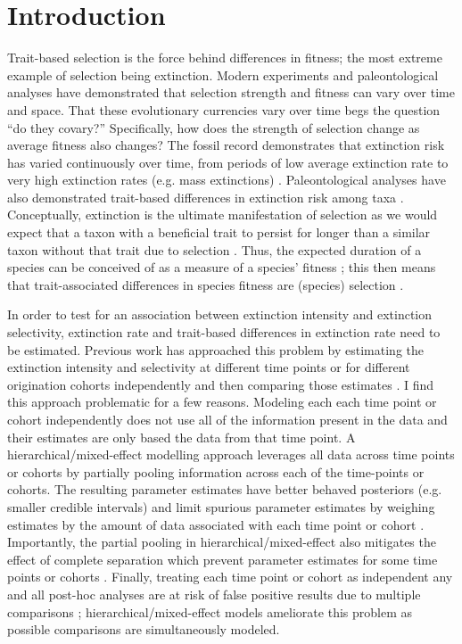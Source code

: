 \documentclass[11pt]{article}
\begin{document}
\section*{Introduction}

Trait-based selection is the force behind differences in fitness; the most extreme example of selection being extinction. Modern experiments and paleontological analyses have demonstrated that selection strength and fitness can vary over time and space. That these evolutionary currencies vary over time begs the question ``do they covary?'' Specifically, how does the strength of selection change as average fitness also changes? The fossil record demonstrates that extinction risk has varied continuously over time, from periods of low average extinction rate to very high extinction rates (e.g. mass extinctions) \citep{Foote2001,Foote2000,Foote2000a}. Paleontological analyses have also demonstrated trait-based differences in extinction risk among taxa \citep{Jablonski2008a}. Conceptually, extinction is the ultimate manifestation of selection as we would expect that a taxon with a beneficial trait to persist for longer than a similar taxon without that trait due to selection \citep{Jablonski2008a,Rabosky2010b,Raup1994,Stanley1975}. Thus, the expected duration of a species can be conceived of as a measure of a species' fitness \citep{Cooper1984}; this then means that trait-associated differences in species fitness are (species) selection \citep{Rabosky2010b}.

In order to test for an association between extinction intensity and extinction selectivity, extinction rate and trait-based differences in extinction rate need to be estimated. Previous work has approached this problem by estimating the extinction intensity and selectivity at different time points or for different origination cohorts independently and then comparing those estimates \citep{Payne2016}. I find this approach problematic for a few reasons.  Modeling each each time point or cohort independently does not use all of the information present in the data and their estimates are only based the data from that time point. A hierarchical/mixed-effect modelling approach leverages all data across time points or cohorts by partially pooling information across each of the time-points or cohorts. The resulting parameter estimates have better behaved posteriors (e.g. smaller credible intervals) and limit spurious parameter estimates by weighing estimates by the amount of data associated with each time point or cohort \citep{Gelman2013d}. Importantly, the partial pooling in hierarchical/mixed-effect also mitigates the effect of complete separation which prevent parameter estimates for some time points or cohorts \citep{Payne2016,Gelman2013d}. Finally, treating each time point or cohort as independent any and all post-hoc analyses are at risk of false positive results due to multiple comparisons \citep{Gelman2007,Gelman2013d}; hierarchical/mixed-effect models ameliorate this problem as possible comparisons are simultaneously modeled.
\end{document}
